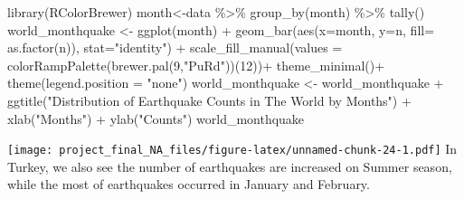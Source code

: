 \documentclass[
]{article}
\newenvironment{Shaded}{\begin{snugshade}}{\end{snugshade}}
\newcommand{\AttributeTok}[1]{\textcolor[rgb]{0.77,0.63,0.00}{#1}}
\newcommand{\DecValTok}[1]{\textcolor[rgb]{0.00,0.00,0.81}{#1}}
\newcommand{\FunctionTok}[1]{\textcolor[rgb]{0.00,0.00,0.00}{#1}}
\newcommand{\NormalTok}[1]{#1}
\newcommand{\OtherTok}[1]{\textcolor[rgb]{0.56,0.35,0.01}{#1}}
\newcommand{\SpecialCharTok}[1]{\textcolor[rgb]{0.00,0.00,0.00}{#1}}
\newcommand{\StringTok}[1]{\textcolor[rgb]{0.31,0.60,0.02}{#1}}
\begin{document}
\begin{Shaded}
\begin{Highlighting}[]
\FunctionTok{library}\NormalTok{(RColorBrewer)}
\NormalTok{month}\OtherTok{\textless{}{-}}\NormalTok{data }\SpecialCharTok{\%\textgreater{}\%} \FunctionTok{group\_by}\NormalTok{(month) }\SpecialCharTok{\%\textgreater{}\%} \FunctionTok{tally}\NormalTok{()}
\NormalTok{world\_monthquake }\OtherTok{\textless{}{-}} \FunctionTok{ggplot}\NormalTok{(month) }\SpecialCharTok{+} \FunctionTok{geom\_bar}\NormalTok{(}\FunctionTok{aes}\NormalTok{(}\AttributeTok{x=}\NormalTok{month, }\AttributeTok{y=}\NormalTok{n, }\AttributeTok{fill=} \FunctionTok{as.factor}\NormalTok{(n)), }\AttributeTok{stat=}\StringTok{"identity"}\NormalTok{) }\SpecialCharTok{+}
     \FunctionTok{scale\_fill\_manual}\NormalTok{(}\AttributeTok{values =} \FunctionTok{colorRampPalette}\NormalTok{(}\FunctionTok{brewer.pal}\NormalTok{(}\DecValTok{9}\NormalTok{,}\StringTok{"PuRd"}\NormalTok{))(}\DecValTok{12}\NormalTok{))}\SpecialCharTok{+}
     \FunctionTok{theme\_minimal}\NormalTok{()}\SpecialCharTok{+}
     \FunctionTok{theme}\NormalTok{(}\AttributeTok{legend.position =} \StringTok{"none"}\NormalTok{)}
\NormalTok{world\_monthquake }\OtherTok{\textless{}{-}}\NormalTok{ world\_monthquake }\SpecialCharTok{+} \FunctionTok{ggtitle}\NormalTok{(}\StringTok{"Distribution of Earthquake Counts in The World by Months"}\NormalTok{) }\SpecialCharTok{+} \FunctionTok{xlab}\NormalTok{(}\StringTok{"Months"}\NormalTok{) }\SpecialCharTok{+} \FunctionTok{ylab}\NormalTok{(}\StringTok{"Counts"}\NormalTok{)}
\NormalTok{world\_monthquake}
\end{Highlighting}
\end{Shaded}

\texttt{[image: project\_final\_NA\_files/figure-latex/unnamed-chunk-24-1.pdf]}
In Turkey, we also see the number of earthquakes are increased on Summer
season, while the most of earthquakes occurred in January and February.
\end{document}
